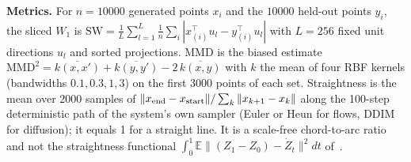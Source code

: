 \textbf{Metrics.} For $n{=}10000$ generated points $x_i$ and the $10000$ held-out points $y_i$, the sliced $W_1$ is $\mathrm{SW}=\frac1L\sum_{l=1}^L\frac1n\sum_{i}|x_{(i)}^\top u_l-y_{(i)}^\top u_l|$ with $L{=}256$ fixed unit directions $u_l$ and sorted projections. MMD is the biased estimate $\mathrm{MMD}^2=\overline{k(x,x')}+\overline{k(y,y')}-2\,\overline{k(x,y)}$ with $k$ the mean of four RBF kernels (bandwidths $0.1,0.3,1,3$) on the first 3000 points of each set. Straightness is the mean over 2000 samples of $\|x_{\rm end}-x_{\rm start}\|/\sum_k\|x_{k+1}-x_k\|$ along the 100-step deterministic path of the system's own sampler (Euler or Heun for flows, DDIM for diffusion); it equals 1 for a straight line. It is a scale-free chord-to-arc ratio and not the straightness functional $\int_0^1\mathbb E\|(Z_1-Z_0)-\dot Z_t\|^2dt$ of~\cite{liu2022flow}.
